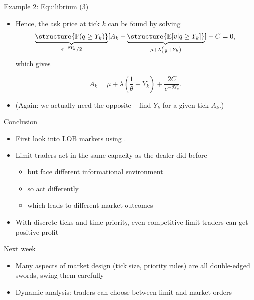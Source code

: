 \documentclass[english,10pt
,aspectratio=169
]{beamer}
\begin{document}
\begin{frame}{Example 2: Equilibrium (3)}
	\begin{itemize}
		\item Hence, the ask price at tick $k$ can be found by solving
		\[
		\underbrace{\structure{\mathbb{P}(q \geq Y_k)}}_{e^{-\theta Y_{k}}/2}[A_k-\underbrace{\structure{\mathbb{E}[v|q \geq Y_k]}}_{\mu + \lambda \left( \frac{1}{\theta }+ Y_{k} \right)}] - C = 0,
		\]
		which gives
		\begin{block}{}
			\[
			A_k=\mu + \lambda \left( \frac{1}{\theta }+ Y_{k}\right) + \frac{2C}{e^{-\theta Y_{k}}}.
			\]
		\end{block}
		\item (Again: we actually need the opposite -- find $Y_k$ for a given tick $A_k$.)
	\end{itemize}
\end{frame}


\begin{frame}{Conclusion}
	\begin{itemize}
		\item First look into LOB markets using \cite{glosten_is_1994}.
		\item Limit traders act in the same capacity as the dealer did before
		\begin{itemize}
			\item but face different \alert{informational environment}
			\item so act differently
			\item which leads to different market outcomes
		\end{itemize}
		\item With discrete ticks and time priority, even competitive limit traders can get positive profit
	\end{itemize}
\end{frame}


\begin{frame}{Next week}
	\begin{itemize}
		\item Many aspects of market design (tick size, priority rules) are all double-edged swords, swing them carefully
		\item Dynamic analysis: traders can choose between limit and market orders
	\end{itemize}
\end{frame}
\end{document}
